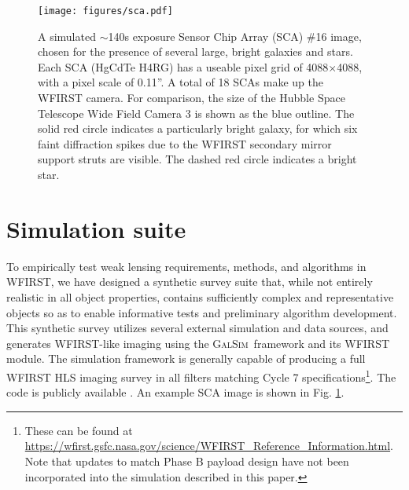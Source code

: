 \documentclass[aps,prd, amsmath,amssymb,superscriptaddress,showkeys,nofootinbib,reprint,preprintnumbers]{revtex4-1}
\newcommand{\galsim}{\textsc{GalSim}}
\begin{document}
\begin{figure}
\begin{center}
\texttt{[image: figures/sca.pdf]}
\end{center}
\caption[]{
A simulated $\sim$140s exposure Sensor Chip Array (SCA) \#16 image, chosen for the presence of several large, bright galaxies and stars. Each SCA (HgCdTe H4RG) has a useable pixel grid of 4088$\times$4088, with a pixel scale of 0.11''. A total of 18 SCAs make up the WFIRST camera. For comparison, the size of the Hubble Space Telescope Wide Field Camera 3 is shown as the blue outline. The solid red circle indicates a particularly bright galaxy, for which six faint diffraction spikes due to the WFIRST secondary mirror support struts are visible. The dashed red circle indicates a bright star.
\label{fig:sca}}
\end{figure}





\section{Simulation suite}\label{sec:sim}

To empirically test weak lensing requirements, methods, and algorithms in WFIRST, we have designed a synthetic survey suite that, while not entirely realistic in all object properties, contains sufficiently complex and representative objects so as to enable informative tests and preliminary algorithm development. 
This synthetic survey utilizes several external simulation and data sources, and generates WFIRST-like imaging using the \galsim\ framework and its WFIRST module. 
The simulation framework is generally capable of producing a full WFIRST HLS imaging survey in all filters matching Cycle 7 specifications\footnote{These can be found at \url{https://wfirst.gsfc.nasa.gov/science/WFIRST_Reference_Information.html}. Note that updates to match Phase B payload design have not been incorporated into the simulation described in this paper.}. 
The code is publicly available \cite{wfirst_imsim}. An example SCA image is shown in Fig. \ref{fig:sca}.
\end{document}
